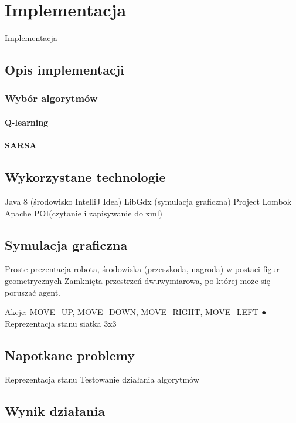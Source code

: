 \chapter{Implementacja}
\label{cha:implementacja}

Implementacja

\section{Opis implementacji}
\label{sec:opisimplementacji}

\subsection{Wybór algorytmów}
\label{subsec:wyboralgorytmow}

\subsubsection{Q-learning}
\label{subsubsec:qlearning}

\subsubsection{SARSA}
\label{subsubsec:sarsa}

\section{Wykorzystane technologie}
\label{sec:wykorzystanetechnologie}

Java 8 (środowisko IntelliJ Idea)
LibGdx (symulacja graficzna)
Project Lombok
Apache POI(czytanie i zapisywanie do xml)

\section{Symulacja graficzna}
\label{sec:symulacjagraficzna}

Proste prezentacja robota, środowiska
(przeszkoda, nagroda) w postaci figur
geometrycznych
Zamknięta przestrzeń dwuwymiarowa, po
której może się poruszać agent.

Akcje: MOVE_UP, MOVE_DOWN,
MOVE_RIGHT, MOVE_LEFT
● Reprezentacja stanu
siatka 3x3

\section{Napotkane problemy}
\label{sec:napotkaneproblemy}

Reprezentacja stanu
Testowanie działania algorytmów

\section{Wynik działania}
\label{sec:wynikdzialania}
















